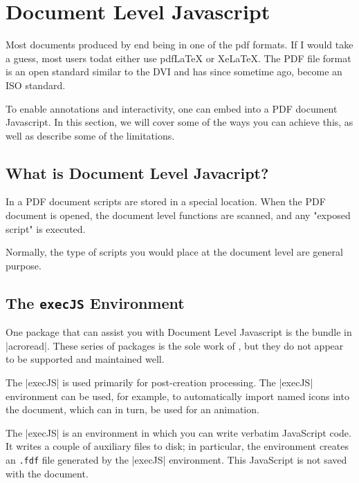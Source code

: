 \chapter{Document Level Javascript}
\label{JavaScript}

\begin{multicols}{2}
Most documents produced by \alltex end being in one of the pdf formats. If I would take a guess, most users todat either use pdfLaTeX or XeLaTeX. The PDF file format is an open standard similar to the DVI and has since sometime ago, become an ISO standard.

To enable annotations and interactivity, one can embed into a PDF document Javascript. In this section, we will cover some of the ways you can achieve this, as well as describe some of the limitations.



\section{What is Document Level Javacript?}
In a PDF document scripts are stored in a special location. When the PDF document is opened, 
the document level functions are scanned, and any "exposed script" is executed.

Normally, the type of scripts you would place at the document level are general purpose.


\section{The \protect\texttt{execJS} Environment}
 
One package that can assist you with Document Level Javascript is the bundle in |acroread|. These series of packages is the sole work of , but they do not appear to be supported and maintained well. 

\begin{teXXX}
 \usepackage[pdftex]{insdljs}
\end{teXXX}

The |execJS| is used primarily for post-creation processing. The |execJS| environment can be used, for example, to automatically import named icons into the document, which can in turn, be used for an animation.

The |execJS| is an environment in which you can write verbatim JavaScript code. It writes a couple of auxiliary files to disk; in particular, the environment creates an \texttt{.fdf} file generated by the |execJS| environment. This JavaScript is not saved with the document.




\end{multicols}
